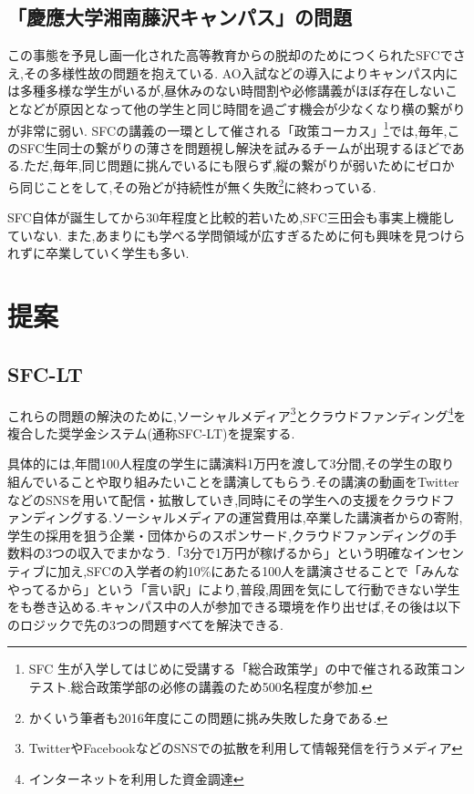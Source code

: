 \documentclass[uplatex, a4j]{jsarticle}
\begin{document}
\subsection{「慶應大学湘南藤沢キャンパス」の問題}
  この事態を予見し画一化された高等教育からの脱却のためにつくられたSFC\cite{kakuitsu}でさえ,その多様性故の問題を抱えている.
  AO入試などの導入によりキャンパス内には多種多様な学生がいるが,昼休みのない時間割や必修講義がほぼ存在しないことなどが原因となって他の学生と同じ時間を過ごす機会が少なくなり横の繋がりが非常に弱い.
  SFCの講義の一環として催される「政策コーカス」\footnote{SFC
  生が入学してはじめに受講する「総合政策学」の中で催される政策コンテスト.総合政策学部の必修の講義のため500名程度が参加.}では,毎年,このSFC生同士の繋がりの薄さを問題視し解決を試みるチームが出現するほどである.ただ,毎年,同じ問題に挑んでいるにも限らず,縦の繋がりが弱いためにゼロから同じことをして,その殆どが持続性が無く失敗\footnote{かくいう筆者も2016年度にこの問題に挑み失敗した身である.}に終わっている.

  SFC自体が誕生してから30年程度と比較的若いため,SFC三田会も事実上機能していない.\cite{diamond}
  また,あまりにも学べる学問領域が広すぎるために何も興味を見つけられずに卒業していく学生も多い.



\section{提案}
\subsection{SFC-LT}

これらの問題の解決のために,ソーシャルメディア\footnote{TwitterやFacebookなどのSNSでの拡散を利用して情報発信を行うメディア}とクラウドファンディング\footnote{インターネットを利用した資金調達}を複合した奨学金システム(通称SFC-LT)を提案する.

具体的には,年間100人程度の学生に講演料1万円を渡して3分間,その学生の取り組んでいることや取り組みたいことを講演してもらう.その講演の動画をTwitterなどのSNSを用いて配信・拡散していき,同時にその学生への支援をクラウドファンディングする.ソーシャルメディアの運営費用は,卒業した講演者からの寄附,学生の採用を狙う企業・団体からのスポンサード,クラウドファンディングの手数料の3つの収入でまかなう.「3分で1万円が稼げるから」という明確なインセンティブに加え,SFCの入学者の約10\%にあたる100人を講演させることで「みんなやってるから」という「言い訳」により,普段,周囲を気にして行動できない学生をも巻き込める.キャンパス中の人が参加できる環境を作り出せば,その後は以下のロジックで先の3つの問題すべてを解決できる.
\end{document}
